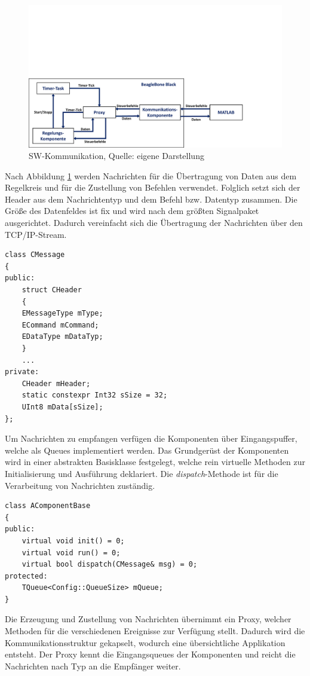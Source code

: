 \documentclass{article}
\begin{document}
\begin{figure}[!h]
\centering
\includegraphics[width=0.8\linewidth, trim={0cm 0cm 2.5cm 9.5cm},clip]{img/SW_kommunikation}
\caption{SW-Kommunikation, Quelle: eigene Darstellung}
\label{img_kommunikation_sw}
\end{figure}

Nach Abbildung \ref{img_kommunikation_sw} werden Nachrichten für die Übertragung von Daten aus dem Regelkreis und für die Zustellung von Befehlen verwendet. Folglich setzt sich der Header aus dem Nachrichtentyp und dem Befehl bzw. Datentyp zusammen. Die Größe des Datenfeldes ist fix und wird nach dem größten Signalpaket ausgerichtet. Dadurch vereinfacht sich die Übertragung der Nachrichten über den TCP/IP-Stream.

\begin{lstlisting}
class CMessage
{
public:
	struct CHeader
	{
	EMessageType mType;
	ECommand mCommand;
	EDataType mDataTyp;
	}
	...
private:
	CHeader mHeader;
	static constexpr Int32 sSize = 32;
	UInt8 mData[sSize];
};
\end{lstlisting}

Um Nachrichten zu empfangen verfügen die Komponenten über Eingangspuffer, welche als Queues implementiert werden. Das Grundgerüst der Komponenten wird in einer abstrakten Basisklasse festgelegt, welche rein virtuelle Methoden zur Initialisierung und Ausführung deklariert. Die \textit{dispatch}-Methode ist für die Verarbeitung von Nachrichten zuständig.

\begin{lstlisting}
class AComponentBase
{
public:
	virtual void init() = 0;
	virtual void run() = 0;
	virtual bool dispatch(CMessage& msg) = 0;
protected:
	TQueue<Config::QueueSize> mQueue;
}
\end{lstlisting}

Die Erzeugung und Zustellung von Nachrichten übernimmt ein Proxy, welcher Methoden für die verschiedenen Ereignisse zur Verfügung stellt. Dadurch wird die Kommunikationsstruktur gekapselt, wodurch eine übersichtliche Applikation entsteht. Der Proxy kennt die Eingangsqueues der Komponenten und reicht die Nachrichten nach Typ an die Empfänger weiter.
\end{document}
